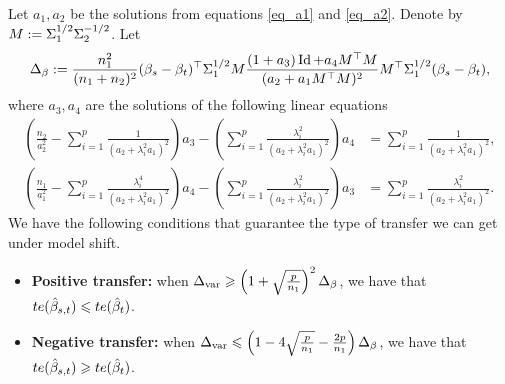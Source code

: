 \begin{theorem}\label{thm_model_shift}
	Let $a_1, a_2$ be the solutions from equations \eqref{eq_a1} and \eqref{eq_a2}.
	Denote by $M := \Sigma_1^{1/2}\Sigma_2^{-1/2}$.
	Let
	\[ \Delta_{\beta} := \frac{n_1^2}{(n_1 + n_2)^2}(\beta_s - \beta_t)^{\top} \Sigma_1^{1/2} M \frac{(1 + a_3)\operatorname{Id} + a_4 M^{\top}M}{(a_2 + a_1 M^{\top}M)^2} M^{\top} \Sigma_1^{1/2} (\beta_s - \beta_t), \]
	where $a_3, a_4$ are the solutions of the following linear equations
	\begin{align}
		\left(\frac{n_2}{a_2^2}- \sum_{i=1}^p \frac{1}{ (a_2 + \lambda_i^2a_1)^2  }\right) a_3 -  \left(\sum_{i=1}^p \frac{  \lambda_i^2 }{ (  a_2 + \lambda_i^2a_1)^2  }\right)a_4
		&= \sum_{i=1}^p \frac{1 }{ (  a_2 + \lambda_i^2a_1)^2  }, \label{eq_a3} \\
		\left(\frac{n_1}{a_1^2} -  \sum_{i=1}^p \frac{\lambda_i^4   }{  (a_2 + \lambda_i^2a_1)^2  }\right)a_4 -\left(\sum_{i=1}^p \frac{\lambda_i^2  }{  (a_2 + \lambda_i^2a_1)^2  }\right)a_3
		&= \sum_{i=1}^p \frac{\lambda_i^2 }{  (a_2 + \lambda_i^2a_1)^2  }. \label{eq_a4}
	\end{align}
	We have the following conditions that guarantee the type of transfer we can get under model shift.
	\begin{itemize}
		\item {\bf Positive transfer:} when ${\Delta_{\text{var}}} \geqslant \left({1 + \sqrt{\frac{p}{n_1}}}\right)^2 {\Delta_{\beta}} $, we have that $te(\hat{\beta}_{s,t}) \leqslant te(\hat{\beta}_t)$.
		\item {\bf Negative transfer:} when $\Delta_{\text{var}} \leqslant \left({1 - 4\sqrt{\frac{p}{n_1}} - \frac{2p}{n_1}}\right) {\Delta_{\beta}} $, we have that $te(\hat{\beta}_{s,t}) \geqslant te(\hat{\beta}_t)$.
	\end{itemize}
\end{theorem}


